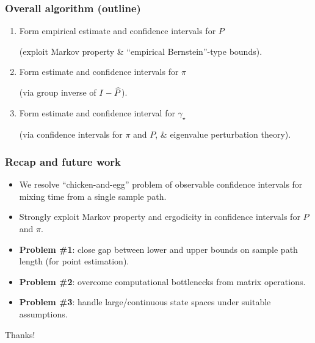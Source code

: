 \documentclass[11pt,compress,blue4,notheorem]{beamer}
\newcommand\fns\footnotesize
\newcommand\gap{\ensuremath{\gamma_{\star}}}
\begin{document}
\begin{frame}
  \frametitle{Overall algorithm (outline)}

  \begin{enumerate}
    \item
      Form empirical estimate and confidence intervals for $P$

      {\fns(exploit Markov property \& ``empirical Bernstein''-type bounds)}.

      \medskip

    \item
      Form estimate and confidence intervals for $\pi$

      {\fns(via group inverse of $I - \widehat P$)}.

      \medskip

    \item
      Form estimate and confidence interval for $\gap$

      {\fns(via confidence intervals for $\pi$ and $P$, \& eigenvalue perturbation theory)}.

  \end{enumerate}
\end{frame}


\begin{frame}
  \frametitle{Recap and future work}

  \begin{itemize}
    \item
      We resolve ``chicken-and-egg'' problem of observable
      confidence intervals for mixing time from a single sample path.

    \item<2->
      Strongly exploit Markov property and ergodicity in confidence
      intervals for $P$ and $\pi$.

    \item<3->
      \textbf{Problem \#1}:
      \textcolor{britishracinggreen}{%
        close gap between lower and upper bounds on sample path length
        (for point estimation).%
      }

    \item<4->
      \textbf{Problem \#2}:
      \textcolor{britishracinggreen}{%
        overcome computational bottlenecks from matrix operations.%
      }

    \item<5->
      \textbf{Problem \#3}:
      \textcolor{boldgreen}{%
        handle large/continuous state spaces under suitable
        assumptions.%
      }

  \end{itemize}

\end{frame}


\begin{frame}
  \begin{center}
    \Huge
    Thanks!
  \end{center}
\end{frame}

\end{document}
